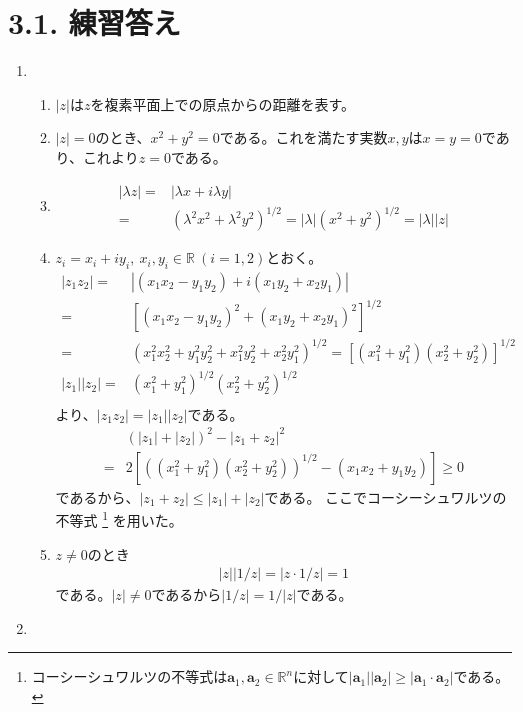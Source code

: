 \documentclass{jreport}
\begin{document}
\section*{3.1. 練習答え}
\begin{enumerate}[label=\textbf{\arabic*.}]
\item
\begin{enumerate}
\item $|z|$は$z$を複素平面上での原点からの距離を表す。
\item $|z|=0$のとき、$x^{2}+y^{2}=0$である。これを満たす実数$x,y$は$x=y=0$であり、これより$z=0$である。
\item \begin{align*}
|\lambda z|=&|\lambda x+i\lambda y|\\
=&(\lambda^{2}x^{2}+\lambda^{2}y^{2})^{1/2}
=|\lambda|(x^{2}+y^{2})^{1/2}=|\lambda||z|
\end{align*}
\item $z_{i}=x_{i}+iy_{i},\ x_{i},y_{i}\in\mathbb{R}\ (i=1,2)$とおく。
\begin{align*}
|z_{1}z_{2}|=&|(x_{1}x_{2}-y_{1}y_{2})+i(x_{1}y_{2}+x_{2}y_{1})|\\
=&[(x_{1}x_{2}-y_{1}y_{2})^{2}+(x_{1}y_{2}+x_{2}y_{1})^{2}]^{1/2}\\
=&(x_{1}^{2}x_{2}^{2}+y_{1}^{2}y_{2}^{2}+x_{1}^{2}y_{2}^{2}+x_{2}^{2}y_{1}^{2})^{1/2}
=[(x_{1}^{2}+y_{1}^{2})(x_{2}^{2}+y_{2}^{2})]^{1/2}\\
|z_{1}||z_{2}|=&(x_{1}^{2}+y_{1}^{2})^{1/2}(x_{2}^{2}+y_{2}^{2})^{1/2}\\
\end{align*}
より、$|z_{1}z_{2}|=|z_{1}||z_{2}|$である。
\begin{align*}
&(|z_{1}|+|z_{2}|)^{2}-|z_{1}+z_{2}|^{2}\\
=&2[((x_{1}^{2}+y_{1}^{2})(x_{2}^{2}+y_{2}^{2}))^{1/2}-(x_{1}x_{2}+y_{1}y_{2})]\geq0
\end{align*}
であるから、$|z_{1}+z_{2}|\leq|z_{1}|+|z_{2}|$である。
ここでコーシーシュワルツの不等式
\footnote{コーシーシュワルツの不等式は$\mathbf{a}_{1},\mathbf{a}_{2}\in\mathbb{R}^{n}$に対して$|\mathbf{a}_{1}||\mathbf{a}_{2}|\geq|\mathbf{a}_{1}\cdot\mathbf{a}_{2}|$である。}
を用いた。
\item $z\ne0$のとき
\begin{align*}
|z||1/z|=|z\cdot 1/z|=1
\end{align*}
である。$|z|\ne0$であるから$|1/z|=1/|z|$である。
\end{enumerate}
\item
\begin{enumerate}

\end{enumerate}
\end{enumerate}
\end{document}

